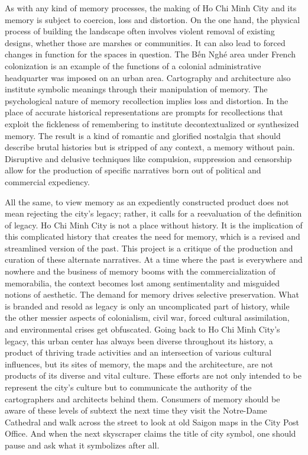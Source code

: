 As with any kind of memory processes, the making of Ho Chi Minh City and its memory is subject to coercion, loss and distortion. On the one hand, the physical process of building the landscape often involves violent removal of existing designs, whether those are marshes or communities. It can also lead to forced changes in function for the spaces in question. The Bến Nghé area under French colonization is an example of the functions of a colonial administrative headquarter was imposed on an urban area. Cartography and architecture also institute symbolic meanings through their manipulation of memory. The psychological nature of memory recollection implies loss and distortion. In the place of accurate historical representations are prompts for recollections that exploit the fickleness of remembering to institute decontextualized or synthesized memory.  The result is a kind of romantic and glorified nostalgia that should describe brutal histories but is stripped of any context, a memory without pain. Disruptive and delusive techniques like compulsion, suppression and censorship allow for the production of specific narratives born out of political and commercial expediency.

All the same, to view memory as an expediently constructed product does not mean rejecting the city’s legacy; rather, it calls for a reevaluation of the definition of legacy. Ho Chi Minh City is not a place without history. It is the implication of this complicated history that creates the need for memory, which is a revised and streamlined version of the past. This project is a critique of the production and curation of these alternate narratives. At a time where the past is everywhere and nowhere and the business of memory booms with the commercialization of memorabilia, the context becomes lost among sentimentality and misguided notions of aesthetic. The demand for memory drives selective preservation. What is branded and resold as legacy is only an uncomplicated part of history, while the other messier aspects of colonialism, civil war, forced cultural assimilation, and environmental crises get obfuscated. Going back to Ho Chi Minh City’s legacy, this urban center has always been diverse throughout its history, a product of thriving trade activities and an intersection of various cultural influences, but its sites of memory, the maps and the architecture, are not products of its diverse and vital culture. These efforts are not only intended to be represent the city’s culture but to communicate the authority of the cartographers and architects behind them. Consumers of memory should be aware of these levels of subtext the next time they visit the Notre-Dame Cathedral and walk across the street to look at old Saigon maps in the City Post Office. And when the next skyscraper claims the title of city symbol, one should pause and ask what it symbolizes after all.

